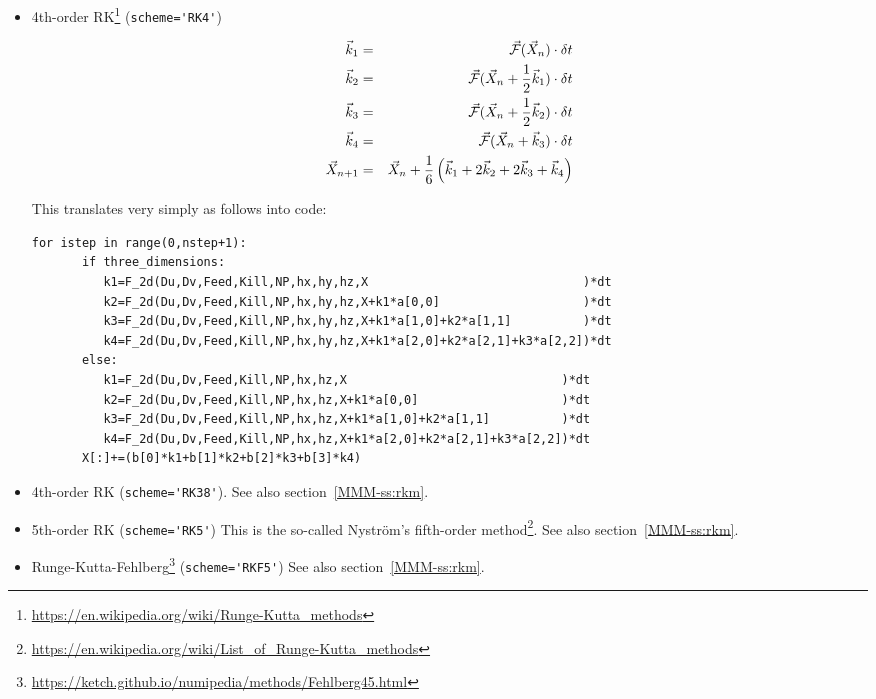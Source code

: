 \begin{itemize}
\item 4th-order RK\footnote{\url{https://en.wikipedia.org/wiki/Runge-Kutta_methods}}
(\lstinline{scheme='RK4'})

\begin{eqnarray}
\vec{k}_1 &=& \vec{\cal F}(\vec{X}_n) \cdot \delta t\nonumber\\
\vec{k}_2 &=& \vec{\cal F}(\vec{X}_n+ \frac12\vec{k}_1) \cdot \delta t \nonumber\\
\vec{k}_3 &=& \vec{\cal F}(\vec{X}_n+ \frac12\vec{k}_2) \cdot \delta t \nonumber\\
\vec{k}_4 &=& \vec{\cal F}(\vec{X}_n+ \vec{k}_3)    \cdot \delta t \nonumber \\
\vec{X}_{n+1} &=& \vec{X}_n + \frac{1}{6}\left(\vec{k}_1 + 2\vec{k}_2 + 2\vec{k}_3 + \vec{k}_4\right)
\end{eqnarray}

This translates very simply as follows into code:
\begin{lstlisting}
for istep in range(0,nstep+1):
       if three_dimensions:
          k1=F_2d(Du,Dv,Feed,Kill,NP,hx,hy,hz,X                              )*dt 
          k2=F_2d(Du,Dv,Feed,Kill,NP,hx,hy,hz,X+k1*a[0,0]                    )*dt
          k3=F_2d(Du,Dv,Feed,Kill,NP,hx,hy,hz,X+k1*a[1,0]+k2*a[1,1]          )*dt
          k4=F_2d(Du,Dv,Feed,Kill,NP,hx,hy,hz,X+k1*a[2,0]+k2*a[2,1]+k3*a[2,2])*dt
       else:
          k1=F_2d(Du,Dv,Feed,Kill,NP,hx,hz,X                              )*dt 
          k2=F_2d(Du,Dv,Feed,Kill,NP,hx,hz,X+k1*a[0,0]                    )*dt
          k3=F_2d(Du,Dv,Feed,Kill,NP,hx,hz,X+k1*a[1,0]+k2*a[1,1]          )*dt
          k4=F_2d(Du,Dv,Feed,Kill,NP,hx,hz,X+k1*a[2,0]+k2*a[2,1]+k3*a[2,2])*dt
       X[:]+=(b[0]*k1+b[1]*k2+b[2]*k3+b[3]*k4)
\end{lstlisting}

\item 4th-order RK (\lstinline{scheme='RK38'}).
See also section~\ref{MMM-ss:rkm}.

\item 5th-order RK (\lstinline{scheme='RK5'})   
This is the so-called Nystr\"{o}m's fifth-order 
method\footnote{\url{https://en.wikipedia.org/wiki/List_of_Runge-Kutta_methods}}.
See also section~\ref{MMM-ss:rkm}.

\item Runge-Kutta-Fehlberg\footnote{\url{https://ketch.github.io/numipedia/methods/Fehlberg45.html}} 
(\lstinline{scheme='RKF5'})
See also section~\ref{MMM-ss:rkm}.


\end{itemize}
